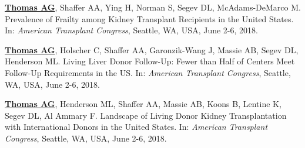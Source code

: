 \documentclass[10pt]{article}
\makeatletter
\newlength{\bibhang}
\newlength{\bibsep}
 {\@listi \global\bibsep\itemsep \global\advance\bibsep by\parsep}
\newenvironment{bibenum*}
  {\renewcommand\labelenumi{[\theenumi]}%
   \etaremune[
     topsep=0pt,
     itemsep=\bibsep,
     parsep=0pt,partopsep=0pt,
     itemindent=-\bibhang,
     leftmargin={\bibhang+\widthof{[999]}}]}
  {\endetaremune}
\makeatother
\begin{document}
\begin{bibenum*}
\item \underline{\textbf{Thomas AG}}, Shaffer AA, Ying H, Norman S,
  Segev DL, McAdams-DeMarco M.
  Prevalence of Frailty among Kidney Transplant Recipients in the United States.
  In: \emph{American Transplant Congress},
  Seattle, WA, USA, June 2-6, 2018.

\item \underline{\textbf{Thomas AG}}, Holscher C, Shaffer AA,
  Garonzik-Wang J, Massie AB, Segev DL, Henderson ML.
  Living Liver Donor Follow-Up: Fewer than Half of
  Centers Meet Follow-Up Requirements in the US.
  In: \emph{American Transplant Congress},
  Seattle, WA, USA, June 2-6, 2018.

\item \underline{\textbf{Thomas AG}}, Henderson ML, Shaffer AA,
  Massie AB, Koons B, Lentine K, Segev DL, Al Ammary F.
  Landscape of Living Donor Kidney Transplantation with
  International Donors in the United States.
  In: \emph{American Transplant Congress},
  Seattle, WA, USA, June 2-6, 2018.






\end{bibenum*}
\end{document}
